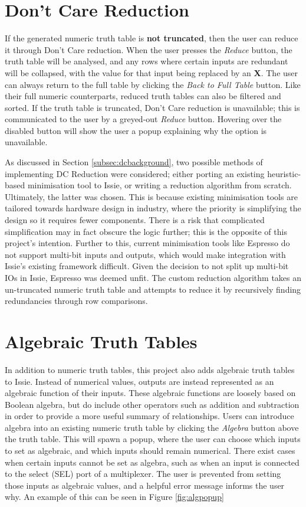 \section{Don't Care Reduction} \label{sec:dcreductionanalysis}
If the generated numeric truth table is \textbf{not truncated}, then the user can reduce it through Don't Care reduction. When the user presses the \textit{Reduce} button, the truth table will be analysed, and any rows where certain inputs are redundant will be collapsed, with the value for that input being replaced by an \textbf{X}. The user can always return to the full table by clicking the \textit{Back to Full Table} button. Like their full numeric counterparts, reduced truth tables can also be filtered and sorted.
If the truth table is truncated, Don't Care reduction is unavailable; this is communicated to the user by a greyed-out \textit{Reduce} button. Hovering over the disabled button will show the user a popup explaining why the option is unavailable.

As discussed in Section \ref{subsec:dcbackground}, two possible methods of implementing DC Reduction were considered; either porting an existing heuristic-based minimisation tool to Issie, or writing a reduction algorithm from scratch. Ultimately, the latter was chosen. This is because existing minimisation tools are tailored towards hardware design in industry, where the priority is simplifying the design so it requires fewer components. There is a risk that complicated simplification may in fact obscure the logic further; this is the opposite of this project's intention. Further to this, current minimisation tools like Espresso \cite{espresso} do not support multi-bit inputs and outputs, which would make integration with Issie's existing framework difficult. Given the decision to not split up multi-bit IOs in Issie, Espresso was deemed unfit. The custom reduction algorithm takes an un-truncated numeric truth table and attempts to reduce it by recursively finding redundancies through row comparisons.

\section{Algebraic Truth Tables}
In addition to numeric truth tables, this project also adds algebraic truth tables to Issie. Instead of numerical values, outputs are instead represented as an algebraic function of their inputs. These algebraic functions are loosely based on Boolean algebra, but do include other operators such as addition and subtraction in order to provide a more useful summary of relationships. Users can introduce algebra into an existing numeric truth table by clicking the \textit{Algebra} button above the truth table. This will spawn a popup, where the user can choose which inputs to set as algebraic, and which inputs should remain numerical. There exist cases when certain inputs cannot be set as algebra, such as when an input is connected to the select (SEL) port of a multiplexer. The user is prevented from setting those inputs as algebraic values, and a helpful error message informs the user why. An example of this can be seen in Figure \ref{fig:algpopup}

